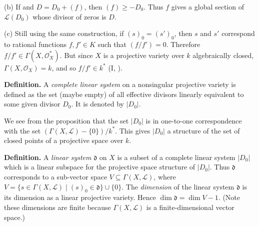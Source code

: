 {(b) If  and $D=D_0+(f)$, then $(f)\geq-D_0$. Thus $f$ gives a global section of $\mathcal L(D_0)$ whose divisor of zeros is $D$.

(c) Still using the same construction, if $(s)_0=(s')_0$, then $s$ and $s'$ correspond to rational functions $f,f'\in K$ such that $(f/f')=0$. Therefore $f/f'\in\Gamma(X,\mathcal O_X^*)$. But since $X$ is a projective variety over $k$ algebraically closed, $\Gamma(X,\mathcal O_X)=k$, and so $f/f'\in k^*$ (I, ).

\medskip
\noindent\textbf{Definition.} A \emph{complete linear system} on a nonsingular projective variety is defined as the set (maybe empty) of all effective divisors linearly equivalent to some given divisor $D_0$. It is denoted by $|D_0|$.

We see from the proposition that the set $|D_0|$ is in one-to-one correspondence with the set $(\Gamma(X,\mathcal L)-\{0\})/k^*$. This gives $|D_0|$ a structure of the set of closed points of a projective space over $k$.

\medskip
\noindent\textbf{Definition.} A \emph{linear system} $\mathfrak d$ on $X$ is a subset of a complete linear system $|D_0|$ which is a linear subspace for the projective space structure of $|D_0|$. Thus $\mathfrak d$ corresponds to a sub-vector space $V\subseteq\Gamma(X,\mathcal L)$, where $V=\{s\in\Gamma(X,\mathcal L)\mid(s)_0\in\mathfrak d\}\cup\{0\}$. The \emph{dimension} of the linear system $\mathfrak d$ is its dimension as a linear projective variety. Hence $\dim\mathfrak d=\dim V-1$. (Note these dimensions are finite because $\Gamma(X,\mathcal L)$ is a finite-dimensional vector space.)
}
